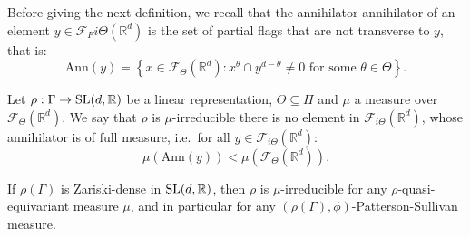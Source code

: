 \documentclass{report}
\begin{document}
Before giving the next definition, we recall that the annihilator annihilator of an element $y \in \mathcal F_F{i \Theta}(\mathbb R^d)$ is the set of partial flags that are not transverse to $y$, that is:
\[
    \mathrm{Ann}(y) = \left\{ x \in \mathcal F_{\Theta}(\mathbb R^d) : x^\theta \cap y^{d- \theta} \neq 0 \text{ for some } \theta \in \Theta \right\}.
\]
\begin{definition}
Let $\rho: \Gamma \to \operatorname{{\mathrm{SL}}}(d,\mathbb R)$ be a linear representation, $\Theta \subseteq \Pi$ and $\mu$ a measure over $\mathcal F_\Theta(\mathbb R^d)$.
We say that $\rho$ is $\mu$-irreducible there is no element in $\mathcal F_{i \Theta}(\mathbb R^d)$, whose annihilator is of full measure, i.e.\ for all $y \in \mathcal F_{i \Theta}(\mathbb R^d)$:
\[
    \mu(\mathrm{Ann}(y)) < \mu(\mathcal F_{\Theta}(\mathbb R^d)).
\]
\end{definition}

\begin{example}\label{ex:ZariskiDense}
    If $\rho(\Gamma)$ is Zariski-dense in $\operatorname{{\mathrm{SL}}} (d, \mathbb R)$, then $\rho$ is $\mu$-irreducible for any $\rho$-quasi-equivariant measure $\mu$, and in particular for any $(\rho(\Gamma), \phi)$-Patterson-Sullivan measure.
\end{example}
\end{document}
